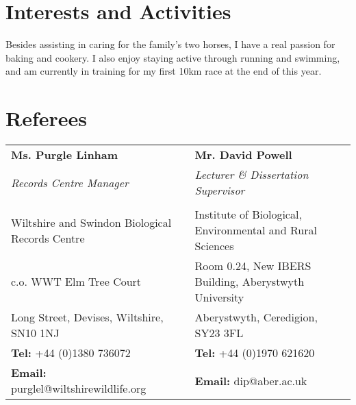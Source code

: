 \documentclass[a4paper, 10pt]{extarticle} %
\begin{document}
%
%
%
%


\section{Interests and Activities}

{\small Besides assisting in caring for the family's two horses, I have a real passion for baking and cookery. I also enjoy staying active through running and swimming, and am currently in training for my first 10km race at the end of this year.}

\vspace{0.2cm}

\section{Referees}

\begin{small}
\begin{tabularx}{\textwidth}{X X}

\textbf{Ms. Purgle Linham} & \textbf{Mr. David Powell} \\
\textit{Records Centre Manager} & \textit{Lecturer \& Dissertation Supervisor} \\\\ 

Wiltshire and Swindon Biological Records Centre & Institute of Biological, Environmental and Rural Sciences \\ 
c.o. WWT Elm Tree Court & Room 0.24, New IBERS Building, Aberystwyth University \\ 
Long Street, Devises, Wiltshire, SN10 1NJ & Aberystwyth, Ceredigion, SY23 3FL  \\
\textbf{Tel:} +44 (0)1380 736072 & \textbf{Tel:}  +44 (0)1970 621620 \\
\textbf{Email:} purglel@wiltshirewildlife.org & \textbf{Email:} dip@aber.ac.uk

\end{tabularx}

\end{small}
\end{document}
